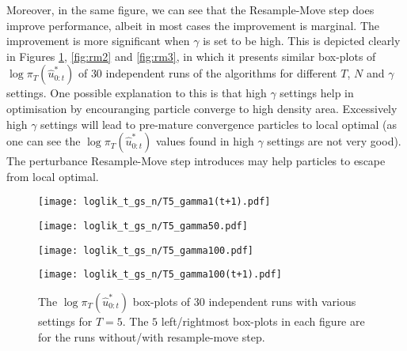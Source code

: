 Moreover, in the same figure, we can see that the Resample-Move step does improve performance, albeit in most cases the improvement is marginal. The improvement is more significant when $\gamma$ is set to be high. This is depicted clearly in Figures \ref{fig:rm1}, \ref{fig:rm2} and \ref{fig:rm3}, in which it presents similar box-plots of $\log\pi_T(\hat{u}^*_{0:t})$ of $30$ independent runs of the algorithms for different $T$, $N$ and $\gamma$ settings. One possible explanation to this is that high $\gamma$ settings help in optimisation by encouranging particle converge to high density area. Excessively high $\gamma$ settings will lead to pre-mature convergence particles to local optimal (as one can see the $\log\pi_T(\hat{u}^*_{0:t})$ values found in high $\gamma$ settings are not very good). The perturbance Resample-Move step introduces may help particles to escape from local optimal.

\begin{figure}[!thbp]
    \centering
    \begin{minipage}{.5\textwidth}
        \centering
        \texttt{[image: loglik\_t\_gs\_n/T5\_gamma1(t+1).pdf]}
    \end{minipage}%
    \begin{minipage}{0.5\textwidth}
        \centering
        \texttt{[image: loglik\_t\_gs\_n/T5\_gamma50.pdf]}
    \end{minipage}
    \begin{minipage}{0.5\textwidth}
        \centering
        \texttt{[image: loglik\_t\_gs\_n/T5\_gamma100.pdf]}
    \end{minipage}%
    \begin{minipage}{0.5\textwidth}
        \centering
        \texttt{[image: loglik\_t\_gs\_n/T5\_gamma100(t+1).pdf]}
    \end{minipage}
    \caption{The $\log\pi_T(\hat{u}^*_{0:t})$ box-plots of 30 independent runs with various settings for $T=5$. The $5$ left/rightmost box-plots in each figure are for the runs without/with resample-move step.}
    \label{fig:rm1}
\end{figure}

